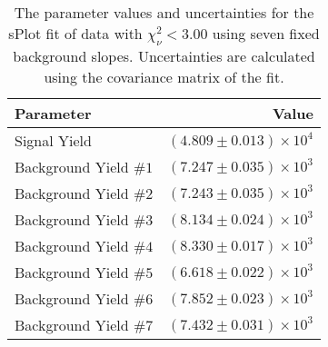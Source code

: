 
\begin{table}[h]
    \begin{center}
        \begin{tabular}{lr}\toprule
            Parameter & Value \\\midrule
            Signal Yield & $(4.809 \pm 0.013) \times 10^{4}$ \\
            Background Yield $\#1$ & $(7.247 \pm 0.035) \times 10^{3}$ \\
            Background Yield $\#2$ & $(7.243 \pm 0.035) \times 10^{3}$ \\
            Background Yield $\#3$ & $(8.134 \pm 0.024) \times 10^{3}$ \\
            Background Yield $\#4$ & $(8.330 \pm 0.017) \times 10^{3}$ \\
            Background Yield $\#5$ & $(6.618 \pm 0.022) \times 10^{3}$ \\
            Background Yield $\#6$ & $(7.852 \pm 0.023) \times 10^{3}$ \\
            Background Yield $\#7$ & $(7.432 \pm 0.031) \times 10^{3}$ \\\bottomrule
        \end{tabular}
        \caption{The parameter values and uncertainties for the sPlot fit of data with $\chi^2_\nu < 3.00$ using seven fixed background slopes. Uncertainties are calculated using the covariance matrix of the fit.}
    \end{center}
\end{table}
